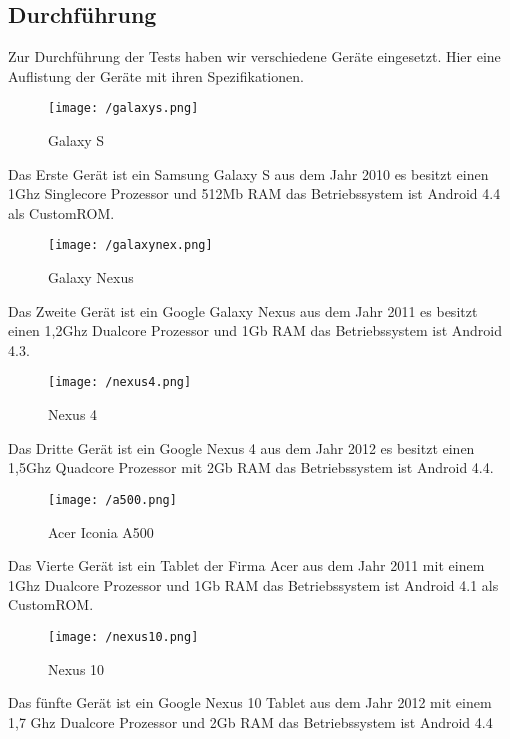 \subsection{Durchführung} 

Zur Durchführung der Tests haben wir verschiedene Geräte eingesetzt. Hier eine Auflistung der Geräte mit ihren Spezifikationen.

\begin{figure}[H]
\centering
\texttt{[image: /galaxys.png]}
\caption{Galaxy S}
\label{fig:galaxy S}
\end{figure}

Das Erste Gerät ist ein Samsung Galaxy S aus dem Jahr 2010 es besitzt einen 1Ghz Singlecore Prozessor und 512Mb RAM das Betriebssystem ist Android 4.4 als CustomROM.\\

\begin{figure}[H]
\centering
\texttt{[image: /galaxynex.png]}
\caption{Galaxy Nexus}
\label{fig:galaxynex}
\end{figure}

Das Zweite Gerät ist ein Google Galaxy Nexus aus dem Jahr 2011 es besitzt einen 1,2Ghz Dualcore Prozessor und 1Gb RAM das Betriebssystem ist Android 4.3.\\

\begin{figure}[H]
\centering
\texttt{[image: /nexus4.png]}
\caption{Nexus 4}
\label{fig:nexus4}
\end{figure}

Das Dritte Gerät ist ein Google Nexus 4 aus dem Jahr 2012 es besitzt einen 1,5Ghz Quadcore Prozessor mit 2Gb RAM das Betriebssystem  ist Android 4.4.\\

\begin{figure}[H]
\centering
\texttt{[image: /a500.png]}
\caption{Acer Iconia A500}
\label{fig:a500}
\end{figure}

Das Vierte Gerät ist ein Tablet der Firma Acer aus dem Jahr 2011 mit einem 1Ghz Dualcore Prozessor und 1Gb RAM das Betriebssystem ist Android 4.1 als CustomROM.\\

\begin{figure}[H]
\centering
\texttt{[image: /nexus10.png]}
\caption{Nexus 10}
\label{fig:nexus10}
\end{figure}

Das fünfte Gerät ist ein Google Nexus 10 Tablet aus dem Jahr 2012 mit einem 1,7 Ghz Dualcore Prozessor und 2Gb RAM das Betriebssystem ist Android 4.4\\

